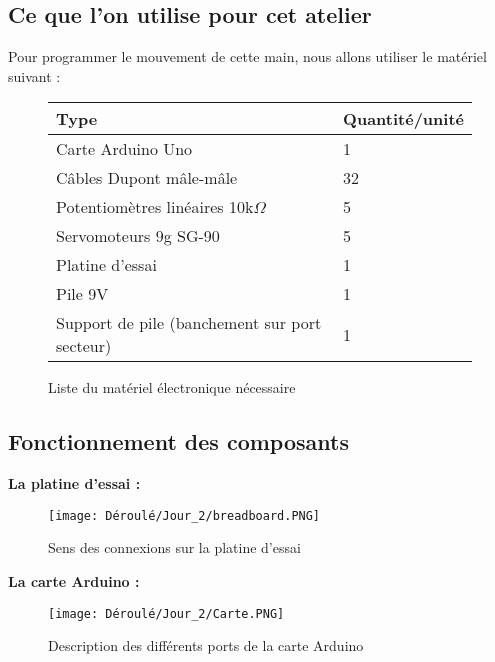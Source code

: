 \subsection{Ce que l'on utilise pour cet atelier }
\begin{flushleft}
    Pour programmer le mouvement de cette main, nous allons utiliser le matériel suivant :\\
    \begin{figure}[!h]
        \centering
        \begin{tabular}{|l|l|}
            \hline Type & Quantité/unité\\
            \hline Carte Arduino Uno & 1\\
            \hline Câbles Dupont mâle-mâle & 32\\
            \hline Potentiomètres linéaires 10k$\Omega$ & 5\\
            \hline Servomoteurs 9g SG-90 & 5\\
            \hline Platine d'essai & 1\\
            \hline Pile 9V & 1\\
            \hline Support de pile (banchement sur port secteur) & 1\\
            \hline
        \end{tabular}
        \caption[Matériel électronique]{Liste du matériel électronique nécessaire}
        \label{2.1}
    \end{figure}
\end{flushleft}

\newpage

\subsection{Fonctionnement des composants}

\begin{flushleft}
    \textbf{La platine d'essai :}\vspace{0.4cm}
    \begin{figure}[!h]
        \centering
        \texttt{[image: Déroulé/Jour\_2/breadboard.PNG]}
        \caption[Platine d'essai]{Sens des connexions sur la platine d'essai}
        \label{2.2}
    \end{figure}

    \textbf{La carte Arduino :}\vspace{0.4cm}
    \begin{figure}[!h]
        \centering
        \texttt{[image: Déroulé/Jour\_2/Carte.PNG]}
        \caption[Carte Arduino]{Description des différents ports de la carte Arduino}
        \label{fig:my_label}
    \end{figure}
    \end{flushleft}
    
